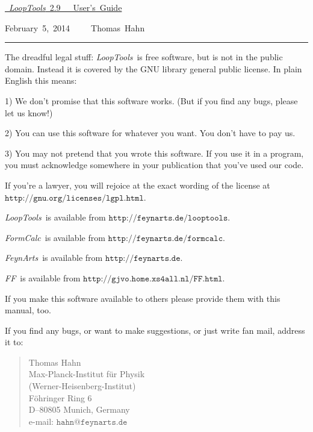 \documentclass[twoside,12pt]{report}
\def\FA{\textit{FeynArts}}
\def\FC{\textit{FormCalc}}
\def\FF{\textit{FF}}
\def\LT{\textit{LoopTools}}
\def\Code#1{\ensuremath{\texttt{#1}}}
\begin{document}
\thispagestyle{empty}

\vspace*{.7\textheight}

\hfill\hbox{\underline{%
\vrule width 0pt height 0pt depth 2ex%
\Huge \LT~2.9~~~User's Guide}}

\vspace*{1ex}

\hfill\hbox{February 5, 2014~~~~~Thomas Hahn}

\clearpage

\vspace*{.5\textheight}
\vfill

\hrule

\medskip

\begin{scriptsize}
The dreadful legal stuff:
\LT\ is free software, but is not in the public domain.
Instead it is covered by the GNU library general public license.
In plain English this means:

1) We don't promise that this software works.   
(But if you find any bugs, please let us know!)

2) You can use this software for whatever you want.
You don't have to pay us.

3) You may not pretend that you wrote this software.
If you use it in a program, you must acknowledge
somewhere in your publication that you've used  
our code.

If you're a lawyer, you will rejoice at the exact wording of the license 
at \Code{http://gnu.org/licenses/lgpl.html}.

\LT\ is available from \Code{http://feynarts.de/looptools}.

\FC\ is available from \Code{http://feynarts.de/formcalc}.

\FA\ is available from \Code{http://feynarts.de}.

\FF\ is available from \Code{http://gjvo.home.xs4all.nl/FF.html}.

If you make this software available to others please provide them with
this manual, too.

If you find any bugs, or want to make suggestions, or just write fan mail,
address it to:
\vspace*{-2ex}
\begin{quote}
Thomas Hahn \\
Max-Planck-Institut f\"ur Physik \\
(Werner-Heisenberg-Institut) \\
F\"ohringer Ring 6 \\
D--80805 Munich, Germany \\
e-mail: \Code{hahn@feynarts.de}
\end{quote}
\end{scriptsize}
\end{document}
